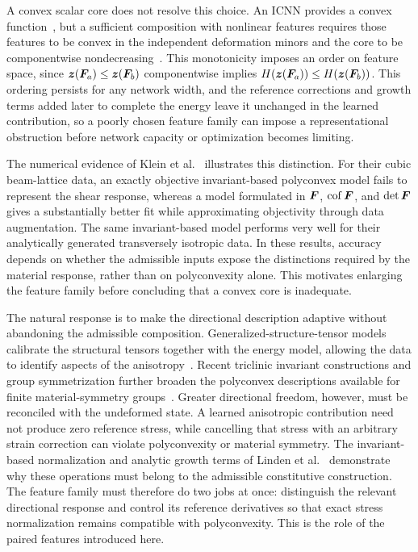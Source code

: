 A convex scalar core does not resolve this choice. An ICNN provides a convex function~\cite{amos2017}, but a sufficient composition with nonlinear features requires those features to be convex in the independent deformation minors and the core to be componentwise nondecreasing~\cite{klein2022}. This monotonicity imposes an order on feature space, since $\bm z(\bm F_a)\leq\bm z(\bm F_b)$ componentwise implies $H(\bm z(\bm F_a))\leq H(\bm z(\bm F_b))$. This ordering persists for any network width, and the reference corrections and growth terms added later to complete the energy leave it unchanged in the learned contribution, so a poorly chosen feature family can impose a representational obstruction before network capacity or optimization becomes limiting.

The numerical evidence of Klein et al.~\cite{klein2022} illustrates this distinction. For their cubic beam-lattice data, an exactly objective invariant-based polyconvex model fails to represent the shear response, whereas a model formulated in $\bm F$, $\operatorname{cof}\bm F$, and $\det\bm F$ gives a substantially better fit while approximating objectivity through data augmentation. The same invariant-based model performs very well for their analytically generated transversely isotropic data. In these results, accuracy depends on whether the admissible inputs expose the distinctions required by the material response, rather than on polyconvexity alone. This motivates enlarging the feature family before concluding that a convex core is inadequate.

The natural response is to make the directional description adaptive without abandoning the admissible composition. Generalized-structure-tensor models calibrate the structural tensors together with the energy model, allowing the data to identify aspects of the anisotropy~\cite{Kalina2024}. Recent triclinic invariant constructions and group symmetrization further broaden the polyconvex descriptions available for finite material-symmetry groups~\cite{klein2026}. Greater directional freedom, however, must be reconciled with the undeformed state. A learned anisotropic contribution need not produce zero reference stress, while cancelling that stress with an arbitrary strain correction can violate polyconvexity or material symmetry. The invariant-based normalization and analytic growth terms of Linden et al.~\cite{linden2023} demonstrate why these operations must belong to the admissible constitutive construction. The feature family must therefore do two jobs at once: distinguish the relevant directional response and control its reference derivatives so that exact stress normalization remains compatible with polyconvexity. This is the role of the paired features introduced here.

